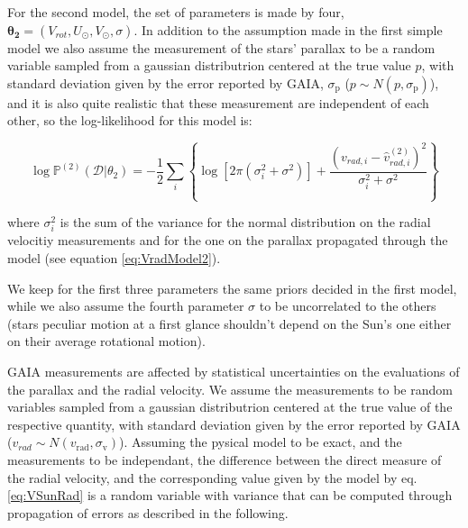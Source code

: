 For the second model, the set of parameters is made by four, $\mathbf{\theta_2} = (V_{rot}, U_{\odot}, V_{\odot}, \sigma)$. In addition to the assumption made in the first simple model we also assume the measurement of the stars' parallax to be a random variable sampled from a gaussian distributrion centered at the true value $p$, with standard deviation given by the error reported by GAIA, $\sigma_{\text{p}}$ ($p \sim N(p,\sigma_{\text{p}})$), and it is also quite realistic that these measurement are independent of each other, so the log-likelihood for this model is:

\begin{equation}\label{Eq:LogLikeMod2}
    \log \mathbb{P}^{(2)}(\mathcal{D} \vert \theta_2) = -\frac{1}{2}\sum_i\left\{\log[2\pi(\sigma_{i}^2+\sigma^2)]+\frac{(v_{rad,i} - \hat{v}_{rad,i}^{(2)})^2}{\sigma_{i}^2+\sigma^2}\right\}
\end{equation}

\noindent where $\sigma_i^2$ is the sum of the variance for the normal distribution on the radial velocitiy measurements and for the one on the parallax propagated through the model (see equation \ref{eq:VradModel2}).

We keep for the first three parameters the same priors decided in the first model, while we also assume the fourth parameter $\sigma$ to be uncorrelated to the others (stars peculiar motion at a first glance shouldn't depend on the Sun's one either on their average rotational motion). 


GAIA measurements are affected by statistical uncertainties on the evaluations of the parallax and the radial velocity. We assume the measurements to be random variables sampled from a gaussian distributrion centered at the true value of the respective quantity, with standard deviation given by the error reported by GAIA ($v_{rad} \sim N(v_{\text{rad}},\sigma_{\text{v}})$). Assuming the pysical model to be exact, and the measurements to be independant, the difference between the direct measure of the radial velocity, and the corresponding value given by the model by eq.\ref{eq:VSunRad} is a random variable with variance that can be computed through propagation of errors as described in the following. 